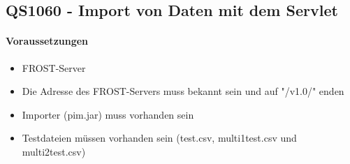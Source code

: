 \newpage

\subsection{QS1060 - Import von Daten mit dem Servlet}
\paragraph{Voraussetzungen}
\begin{itemize}
\item FROST-Server
\item Die Adresse des FROST-Servers muss bekannt sein und auf "/v1.0/" enden
\item Importer (pim.jar) muss vorhanden sein
\item Testdateien müssen vorhanden sein (test.csv, multi1test.csv und multi2test.csv)
\end{itemize}

